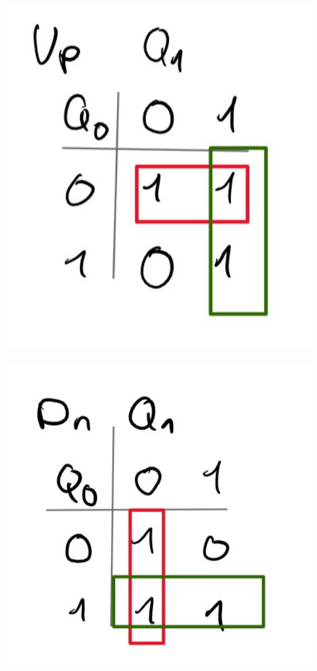 \documentclass[
    paper=a4,
]{scrartcl}
\begin{document}
    \begin{minipage}{0.5\textwidth}
        \centering
            \includegraphics[width=1\textwidth]{asn1.jpg}
            \label{tab:6}    
    \end{minipage}\hfill%
    \begin{minipage}{0.5\textwidth}
        \label{tab:7}
        \includegraphics[width=1\textwidth]{asn2.jpg}
    \end{minipage}
\end{document}
